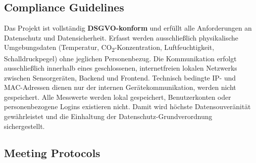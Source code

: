 \documentclass{article}
\begin{document}
\subsection{Compliance Guidelines}

Das Projekt ist vollständig \textbf{DSGVO-konform} und erfüllt alle Anforderungen an Datenschutz und Datensicherheit. 
Erfasst werden ausschließlich physikalische Umgebungsdaten (Temperatur, CO\textsubscript{2}-Konzentration, Luftfeuchtigkeit, Schalldruckpegel) ohne jeglichen Personenbezug. 
Die Kommunikation erfolgt ausschließlich innerhalb eines geschlossenen, internetfreien lokalen Netzwerks zwischen Sensorgeräten, Backend und Frontend. 
Technisch bedingte IP- und MAC-Adressen dienen nur der internen Gerätekommunikation, werden nicht gespeichert. 
Alle Messwerte werden lokal gespeichert, Benutzerkonten oder personenbezogene Logins existieren nicht. 
Damit wird höchste Datensouveränität gewährleistet und die Einhaltung der Datenschutz-Grundverordnung sichergestellt.






\subsection{Meeting Protocols}
\end{document}
